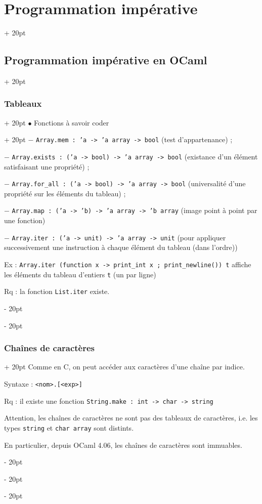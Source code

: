\documentclass[a4paper, 12pt, twoside]{article}
\newcommand{\ind}[1][20pt]{\advance\leftskip + #1}
\newcommand{\deind}[1][20pt]{\advance\leftskip - #1}
\newenvironment{indentedenv}[1][20pt]{\par \ind[#1]}{\par \deind}
\newenvironment{indt}[2][20pt]{#2 \begin{indentedenv}[#1]}{\end{indentedenv}} %
\begin{document}
\begin{indt}{\section{Programmation impérative}}
\begin{indt}{\subsection{Programmation impérative en OCaml}}
\begin{indt}{\subsubsection{Tableaux}}
                \begin{indt}{$\bullet$ Fonctions à savoir coder}
                    $-$ \texttt{Array.mem : 'a -> 'a array -> bool} (test d'appartenance) ;
                    
                    $-$ \texttt{Array.exists : ('a -> bool) -> 'a array -> bool} (existance d'un élément satisfaisant une propriété) ;
                    
                    $-$ \texttt{Array.for\_all : ('a -> bool) -> 'a array -> bool} (universalité d'une propriété sur les éléments du tableau) ;
                    
                    $-$ \texttt{Array.map : ('a -> 'b) -> 'a array -> 'b array} (image point à point par une fonction)
                    
                    $-$ \texttt{Array.iter : ('a -> unit) -> 'a array -> unit} (pour appliquer successivement une instruction à chaque élément du tableau (dans l'ordre))
                    
                    Ex : \texttt{Array.iter (function x -> print\_int x ; print\_newline()) t} affiche les éléments du tableau d'entiers \texttt t (un par ligne)
                    
                    Rq : la fonction \texttt{List.iter} existe.
                \end{indt}
            \end{indt}
            
            \vspace{6pt}
            
            \begin{indt}{\subsubsection{Chaînes de caractères}}
                Comme en C, on peut accéder aux caractères d'une chaîne par indice.
                
                Syntaxe : \texttt{<nom>.[<exp>]}
                
                Rq : il existe une fonction \texttt{String.make : int -> char -> string}
                
                Attention, les chaînes de caractères ne sont pas des tableaux de caractères, i.e. les types \texttt{string} et \texttt{char array} sont distints.
                
                En particulier, depuis OCaml 4.06, les chaînes de caractères sont immuables.
                

\end{indt}
\end{indt}
\end{indt}
\end{document}
